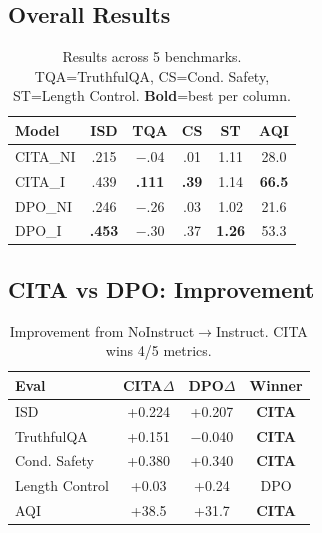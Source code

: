 
\label{sec:results}

\subsection{Overall Results}

\begin{table}[H]
\centering
\footnotesize
\begin{tabular}{@{}lccccc@{}}
\toprule
\textbf{Model} & \textbf{ISD} & \textbf{TQA} & \textbf{CS} & \textbf{ST} & \textbf{AQI} \\
\midrule
CITA\_NI & .215 & $-$.04 & .01 & 1.11 & 28.0 \\
CITA\_I & .439 & \textbf{.111} & \textbf{.39} & 1.14 & \textbf{66.5} \\
DPO\_NI & .246 & $-$.26 & .03 & 1.02 & 21.6 \\
DPO\_I & \textbf{.453} & $-$.30 & .37 & \textbf{1.26} & 53.3 \\
\bottomrule
\end{tabular}
\caption{Results across 5 benchmarks. TQA=TruthfulQA, CS=Cond. Safety, ST=Length Control. \textbf{Bold}=best per column.}
\label{tab:overall_results}
\end{table}

\subsection{CITA vs DPO: Improvement}

\begin{table}[H]
\centering
\footnotesize
\begin{tabular}{@{}lccc@{}}
\toprule
\textbf{Eval} & \textbf{CITA$\Delta$} & \textbf{DPO$\Delta$} & \textbf{Winner} \\
\midrule
ISD & +0.224 & +0.207 & \textbf{CITA} \\
TruthfulQA & +0.151 & $-$0.040 & \textbf{CITA} \\
Cond. Safety & +0.380 & +0.340 & \textbf{CITA} \\
Length Control & +0.03 & +0.24 & DPO \\
AQI & +38.5 & +31.7 & \textbf{CITA} \\
\bottomrule
\end{tabular}
\caption{Improvement from NoInstruct$\rightarrow$Instruct. CITA wins 4/5 metrics.}
\label{tab:improvement_comparison}
\end{table}

